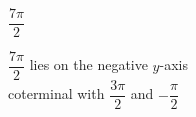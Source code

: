 {$\dfrac{7\pi}{2}$}
{$\dfrac{7\pi}{2}$ lies on the negative $y$-axis \\
coterminal with $\dfrac{3\pi}{2}$ and $-\dfrac{\pi}{2}$ 

\begin{center}
\end{center}}